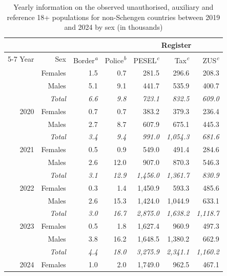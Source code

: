 \begin{table}[H]
\caption{\label{tbl-yearly-data}Yearly information on the observed unauthorised, auxiliary and reference 18+ populations for non-Schengen countries between 2019 and 2024 by sex (in thousands)} 
\fontsize{12.0pt}{14.0pt}\selectfont
\begin{tabular*}{\linewidth}{@{\extracolsep{\fill}}rrrrrrr}
\toprule
 &  &  &  & \multicolumn{3}{c}{{Register}} \\ 
\cmidrule(lr){5-7}
Year & Sex & Border\textsuperscript{\textit{a}} & Police\textsuperscript{\textit{b}} & PESEL\textsuperscript{\textit{c}} & Tax\textsuperscript{\textit{c}} & ZUS\textsuperscript{\textit{c}} \\ 
\midrule\addlinespace[2.5pt]
2019 & Females & 1.5 & 0.7 & 281.5 & 296.6 & 208.3 \\ 
 & Males & 5.1 & 9.1 & 441.7 & 535.9 & 400.7 \\ 
{\itshape } & {\itshape Total} & {\itshape 6.6} & {\itshape 9.8} & {\itshape 723.1} & {\itshape 832.5} & {\itshape 609.0} \\ 
2020 & Females & 0.7 & 0.7 & 383.2 & 379.3 & 236.4 \\ 
 & Males & 2.7 & 8.7 & 607.9 & 675.1 & 445.3 \\ 
{\itshape } & {\itshape Total} & {\itshape 3.4} & {\itshape 9.4} & {\itshape 991.0} & {\itshape 1,054.3} & {\itshape 681.6} \\ 
2021 & Females & 0.5 & 0.9 & 549.0 & 491.4 & 284.6 \\ 
 & Males & 2.6 & 12.0 & 907.0 & 870.3 & 546.3 \\ 
{\itshape } & {\itshape Total} & {\itshape 3.1} & {\itshape 12.9} & {\itshape 1,456.0} & {\itshape 1,361.7} & {\itshape 830.9} \\ 
2022 & Females & 0.3 & 1.4 & 1,450.9 & 593.3 & 485.6 \\ 
 & Males & 2.6 & 15.3 & 1,424.0 & 1,044.9 & 633.1 \\ 
{\itshape } & {\itshape Total} & {\itshape 3.0} & {\itshape 16.7} & {\itshape 2,875.0} & {\itshape 1,638.2} & {\itshape 1,118.7} \\ 
2023 & Females & 0.5 & 1.8 & 1,627.4 & 960.9 & 497.3 \\ 
 & Males & 3.8 & 16.2 & 1,648.5 & 1,380.2 & 662.9 \\ 
{\itshape } & {\itshape Total} & {\itshape 4.4} & {\itshape 18.0} & {\itshape 3,275.9} & {\itshape 2,341.1} & {\itshape 1,160.2} \\ 
2024 & Females & 1.0 & 2.0 & 1,749.0 & 962.5 & 467.1 \\ 

\end{tabular*}
\end{table}
